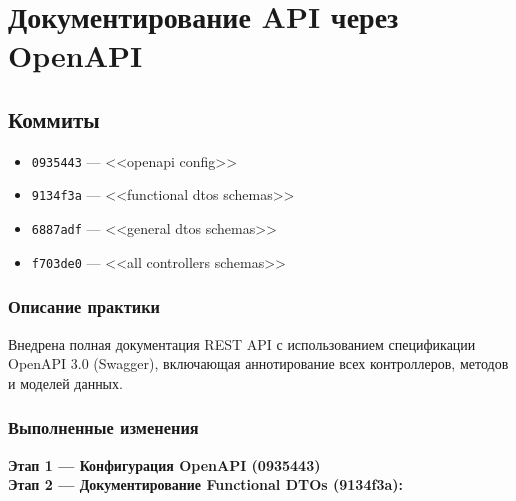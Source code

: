 \documentclass{article}
\begin{document}
\section{Документирование API через OpenAPI}

\subsection{Коммиты}
    \begin{itemize}
        \item \texttt{0935443} --- <<openapi config>>
        \item \texttt{9134f3a} --- <<functional dtos schemas>>
        \item \texttt{6887adf} --- <<general dtos schemas>>
        \item \texttt{f703de0} --- <<all controllers schemas>>
    \end{itemize}

\subsubsection{Описание практики}
Внедрена полная документация REST API с использованием спецификации OpenAPI 3.0 (Swagger), включающая аннотирование всех контроллеров, методов и моделей данных.

\subsubsection{Выполненные изменения}
\textbf{Этап 1 --- Конфигурация OpenAPI (0935443)}\\
\textbf{Этап 2 --- Документирование Functional DTOs (9134f3a):}
\end{document}
